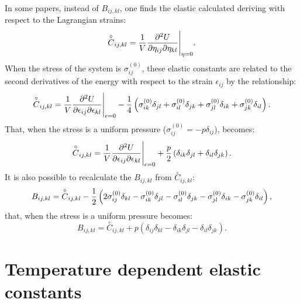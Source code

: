 \documentclass[12pt,a4paper,twoside]{report}
\begin{document}
In some papers, instead of $B_{ij,kl}$, one finds the elastic calculated
deriving with respect to the Lagrangian strains:
\begin{equation}
\overset{\circ}{C}_{ij,kl} = {1\over V} { \partial^2 U \over 
\partial \eta_{ij} \partial 
\eta_{kl}}\Bigg|_{\eta=0}.
\end{equation}
When the stress of the system is $\sigma^{(0)}_{ij}$, these elastic 
constants are related to the second derivatives of the
energy with respect to the strain $\epsilon_{ij}$ by the relationship:
\begin{equation}
\overset{\circ}{C}_{ij,kl} = {1\over V} { \partial^2 U \over \partial \epsilon_{ij} \partial 
\epsilon_{kl}}\Bigg|_{\epsilon=0} - {1\over 4} \left( \sigma^{(0)}_{ik} \delta_{jl} +
\sigma^{(0)}_{il} \delta_{jk}+ \sigma^{(0)}_{jl} \delta_{ik}
+\sigma^{(0)}_{jk} \delta_{il} \right).
\end{equation}
That, when the stress is a uniform pressure ($\sigma^{(0)}_{ij}=-p 
\delta_{ij}$), becomes:
\begin{equation}
\overset{\circ}{C}_{ij,kl} = {1\over V} { \partial^2 U \over \partial \epsilon_{ij} \partial 
\epsilon_{kl}}\Bigg|_{\epsilon=0} + {p\over 2} \left( \delta_{ik} \delta_{jl} +
\delta_{il} \delta_{jk}\right).
\end{equation}
It is also possible to recalculate the $B_{ij,kl}$ from 
$\overset{\circ}{C}_{ij,kl}$:
\begin{equation}
B_{ij,kl} = \overset{\circ}{C}_{ij,kl} -{1\over 2} \left (2 
\sigma^{(0)}_{ij} \delta_{kl}
- \sigma^{(0)}_{ik} \delta_{jl} - \sigma^{(0)}_{il} \delta_{jk}
- \sigma^{(0)}_{jl} \delta_{ik} - \sigma^{(0)}_{jk} \delta_{il} \right),
\end{equation}
that, when the stress is a uniform pressure becomes:
\begin{equation}
B_{ij,kl} = \overset{\circ}{C}_{ij,kl} +p \left (\delta_{ij} \delta_{kl}
- \delta_{ik} \delta_{jl} - \delta_{il} \delta_{jk} \right).
\end{equation}

\newpage

{\color{dark-blue}\chapter{Temperature dependent elastic constants}}
\color{black}
\end{document}
